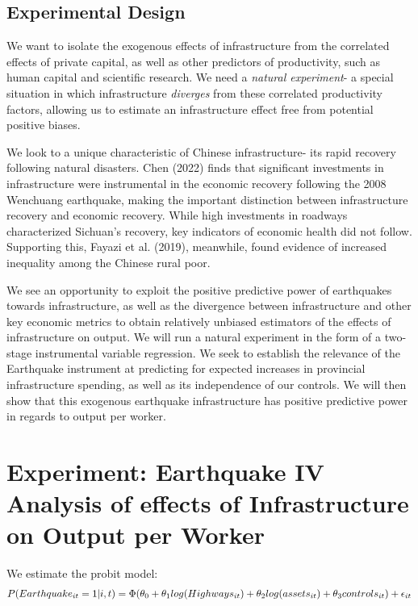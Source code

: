 \documentclass[11pt]{article}
\begin{document}
\subsection{Experimental Design}

We want to isolate the exogenous effects of infrastructure from the correlated effects of private capital, as well as other predictors of productivity, such as human capital and scientific research. We need a \textit{natural experiment}- a special situation in which infrastructure \textit{diverges} from  these correlated productivity factors, allowing us to estimate an infrastructure effect free from potential positive biases. 

We look to a unique characteristic of Chinese infrastructure- its rapid recovery following natural disasters. Chen (2022) finds that significant investments in infrastructure were instrumental in the economic recovery following the 2008 Wenchuang earthquake, making the important distinction between infrastructure recovery and economic recovery.  While high investments in roadways characterized Sichuan's recovery, key indicators of economic health did not follow.
Supporting this, Fayazi et al. (2019), meanwhile, found evidence of increased inequality among the Chinese rural poor.  

We see an opportunity to exploit the positive predictive power of earthquakes towards infrastructure, as well as the divergence between infrastructure and other key economic metrics to obtain relatively unbiased estimators of the effects of infrastructure on output. We will run a natural experiment in the form of a two-stage instrumental variable regression. We seek to establish the relevance of the Earthquake instrument at predicting for expected increases in provincial infrastructure spending, as well as its independence of our controls. We will then show that this exogenous earthquake infrastructure has positive predictive power in regards to output per worker. 

\section{Experiment: Earthquake IV Analysis of effects of Infrastructure on Output per Worker}

We estimate the probit model: \\

\begin{multline}
\small    
P(Earthquake_{it}=1|i,t)=\Phi(\theta_0+\theta_1log(Highways_{it})+\theta_2log(assets_{it})+\theta_3controls_{it} )+\epsilon_{it}\\
\end{multline}
\end{document}
